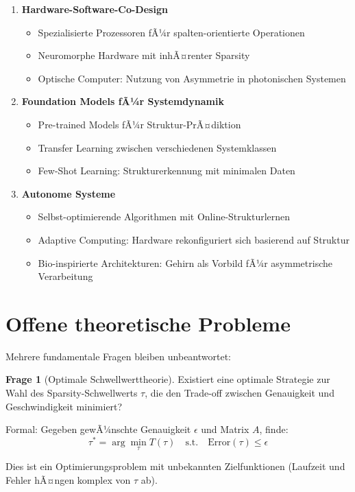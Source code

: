 ﻿\documentclass[a4paper,12pt]{report}
\theoremstyle{definition}
\newtheorem{frage}{Frage}
\begin{document}
	\begin{enumerate}
		\item \textbf{Hardware-Software-Co-Design}
		\begin{itemize}
			\item Spezialisierte Prozessoren fÃ¼r spalten-orientierte Operationen
			\item Neuromorphe Hardware mit inhÃ¤renter Sparsity
			\item Optische Computer: Nutzung von Asymmetrie in photonischen Systemen
		\end{itemize}
		
		\item \textbf{Foundation Models fÃ¼r Systemdynamik}
		\begin{itemize}
			\item Pre-trained Models fÃ¼r Struktur-PrÃ¤diktion
			\item Transfer Learning zwischen verschiedenen Systemklassen
			\item Few-Shot Learning: Strukturerkennung mit minimalen Daten
		\end{itemize}
		
		\item \textbf{Autonome Systeme}
		\begin{itemize}
			\item Selbst-optimierende Algorithmen mit Online-Strukturlernen
			\item Adaptive Computing: Hardware rekonfiguriert sich basierend auf Struktur
			\item Bio-inspirierte Architekturen: Gehirn als Vorbild fÃ¼r asymmetrische Verarbeitung
		\end{itemize}
	\end{enumerate}
	
	\section{Offene theoretische Probleme}
	
	Mehrere fundamentale Fragen bleiben unbeantwortet:
	
	\begin{frage}[Optimale Schwellwerttheorie]
		Existiert eine optimale Strategie zur Wahl des Sparsity-Schwellwerts $\tau$, die den Trade-off zwischen Genauigkeit und Geschwindigkeit minimiert?
		
		Formal: Gegeben gewÃ¼nschte Genauigkeit $\epsilon$ und Matrix $A$, finde:
		\[
		\tau^* = \arg\min_{\tau} T(\tau) \quad \text{s.t.} \quad \text{Error}(\tau) \leq \epsilon
		\]
		
		Dies ist ein Optimierungsproblem mit unbekannten Zielfunktionen (Laufzeit und Fehler hÃ¤ngen komplex von $\tau$ ab).
	\end{frage}
	
\end{document}
